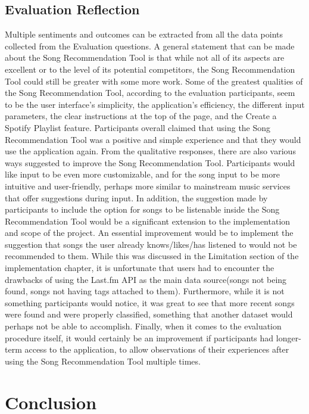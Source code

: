 \documentclass{l4proj}
\begin{document}
\section{Evaluation Reflection}
Multiple sentiments and outcomes can be extracted from all the data points collected from the Evaluation questions. A general statement that can be made about the Song Recommendation Tool is that while not all of its aspects are excellent or to the level of its potential competitors, the Song Recommendation Tool could still be greater with some more work. Some of the greatest qualities of the Song Recommendation Tool, according to the evaluation participants, seem to be the user interface's simplicity, the application's efficiency, the different input parameters, the clear instructions at the top of the page, and the Create a Spotify Playlist feature. Participants overall claimed that using the Song Recommendation Tool was a positive and simple experience and that they would use the application again. From the qualitative responses, there are also various ways suggested to improve the Song Recommendation Tool. Participants would like input to be even more customizable, and for the song input to be more intuitive and user-friendly, perhaps more similar to mainstream music services that offer suggestions during input. In addition, the suggestion made by participants to include the option for songs to be listenable inside the Song Recommendation Tool would be a significant extension to the implementation and scope of the project. An essential improvement would be to implement the suggestion that songs the user already knows/likes/has listened to would not be recommended to them. While this was discussed in the Limitation section of the implementation chapter, it is unfortunate that users had to encounter the drawbacks of using the Last.fm API as the main data source(songs not being found, songs not having tags attached to them). Furthermore, while it is not something participants would notice, it was great to see that more recent songs were found and were properly classified, something that another dataset would perhaps not be able to accomplish. Finally, when it comes to the evaluation procedure itself, it would certainly be an improvement if participants had longer-term access to the application, to allow observations of their experiences after using the Song Recommendation Tool multiple times.
\chapter{Conclusion}
\end{document}
